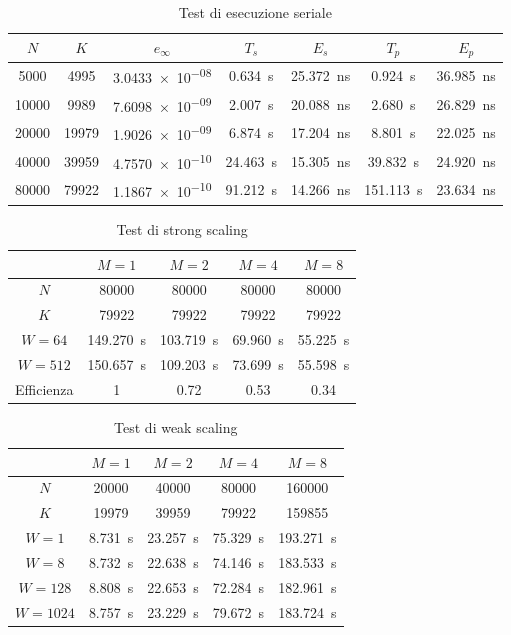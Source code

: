 \documentclass[a4paper,11pt]{article}
\begin{document}
\begin{table}[p]
\caption{Test di esecuzione seriale}
\label{tab:test-seriale}
\centering
\begin{tabular}{ccccccc}
\toprule
$N$ & $K$ & $e_\infty$ & $T_s$ & $E_s$ & $T_p$ & $E_p$ \\
\midrule
5000 & 4995 & \num{3.0433e-08} & \qty{0.634}{s} & \qty{25.372}{ns}
  & \qty{0.924}{s} & \qty{36.985}{ns} \\
10000 & 9989 & \num{7.6098e-09} & \qty{2.007}{s} & \qty{20.088}{ns}
  & \qty{2.680}{s} & \qty{26.829}{ns} \\
20000 & 19979 & \num{1.9026e-09} & \qty{6.874}{s} & \qty{17.204}{ns}
  & \qty{8.801}{s} & \qty{22.025}{ns} \\
40000 & 39959 & \num{4.7570e-10} & \qty{24.463}{s} & \qty{15.305}{ns}
  & \qty{39.832}{s} & \qty{24.920}{ns} \\
80000 & 79922 & \num{1.1867e-10} & \qty{91.212}{s} & \qty{14.266}{ns}
  & \qty{151.113}{s} & \qty{23.634}{ns} \\
\bottomrule
\end{tabular}
\end{table}

\begin{table}[p]
\caption{Test di strong scaling}
\label{tab:test-strong-scaling}
\centering
\begin{tabular}{ccccc}
\toprule
 & $M = 1$ & $M = 2$ & $M = 4$ & $M = 8$ \\
\midrule
$N$ & 80000 & 80000 & 80000 & 80000 \\
$K$ & 79922 & 79922 & 79922 & 79922 \\
\midrule
$W = 64$ & \qty{149.270}{s} & \qty{103.719}{s}
  & \qty{69.960}{s} & \qty{55.225}{s} \\
$W = 512$ & \qty{150.657}{s} & \qty{109.203}{s}
  & \qty{73.699}{s} & \qty{55.598}{s} \\
\midrule
Efficienza & 1 & 0.72 & 0.53 & 0.34 \\
\bottomrule
\end{tabular}
\end{table}

\begin{table}[p]
\caption{Test di weak scaling}
\label{tab:test-weak-scaling}
\centering
\begin{tabular}{ccccc}
\toprule
 & $M = 1$ & $M = 2$ & $M = 4$ & $M = 8$ \\
\midrule
$N$ & 20000 & 40000 & 80000 & 160000 \\
$K$ & 19979 & 39959 & 79922 & 159855 \\
\midrule
$W = 1$ & \qty{8.731}{s} & \qty{23.257}{s}
  & \qty{75.329}{s} & \qty{193.271}{s} \\
$W = 8$ & \qty{8.732}{s} & \qty{22.638}{s}
  & \qty{74.146}{s} & \qty{183.533}{s} \\
$W = 128$ & \qty{8.808}{s} & \qty{22.653}{s}
  & \qty{72.284}{s} & \qty{182.961}{s} \\
$W = 1024$ & \qty{8.757}{s} & \qty{23.229}{s}
  & \qty{79.672}{s} & \qty{183.724}{s} \\
\bottomrule
\end{tabular}
\end{table}
\end{document}
